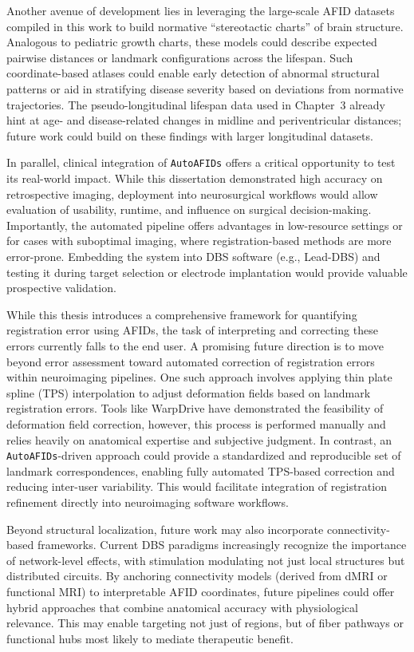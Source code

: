 Another avenue of development lies in leveraging the large-scale AFID datasets compiled in this work to build normative “stereotactic charts” of brain structure. Analogous to pediatric growth charts, these models could describe expected pairwise distances or landmark configurations across the lifespan. Such coordinate-based atlases could enable early detection of abnormal structural patterns or aid in stratifying disease severity based on deviations from normative trajectories. The pseudo-longitudinal lifespan data used in Chapter~3 already hint at age- and disease-related changes in midline and periventricular distances; future work could build on these findings with larger longitudinal datasets.

In parallel, clinical integration of \texttt{AutoAFIDs} offers a critical opportunity to test its real-world impact. While this dissertation demonstrated high accuracy on retrospective imaging, deployment into neurosurgical workflows would allow evaluation of usability, runtime, and influence on surgical decision-making. Importantly, the automated pipeline offers advantages in low-resource settings or for cases with suboptimal imaging, where registration-based methods are more error-prone. Embedding the system into DBS software (e.g., Lead-DBS) and testing it during target selection or electrode implantation would provide valuable prospective validation.

While this thesis introduces a comprehensive framework for quantifying registration error using AFIDs, the task of interpreting and correcting these errors currently falls to the end user. A promising future direction is to move beyond error assessment toward automated correction of registration errors within neuroimaging pipelines. One such approach involves applying thin plate spline (TPS) interpolation \cite{Bookstein1989-zr} to adjust deformation fields based on landmark registration errors. Tools like WarpDrive \cite{Oxenford2024-ah} have demonstrated the feasibility of deformation field correction, however, this process is performed manually and relies heavily on anatomical expertise and subjective judgment. In contrast, an \texttt{AutoAFIDs}-driven approach could provide a standardized and reproducible set of landmark correspondences, enabling fully automated TPS-based correction and reducing inter-user variability. This would facilitate integration of registration refinement directly into neuroimaging software workflows.

Beyond structural localization, future work may also incorporate connectivity-based frameworks. Current DBS paradigms increasingly recognize the importance of network-level effects, with stimulation modulating not just local structures but distributed circuits. By anchoring connectivity models (derived from dMRI or functional MRI) to interpretable AFID coordinates, future pipelines could offer hybrid approaches that combine anatomical accuracy with physiological relevance. This may enable targeting not just of regions, but of fiber pathways or functional hubs most likely to mediate therapeutic benefit.

